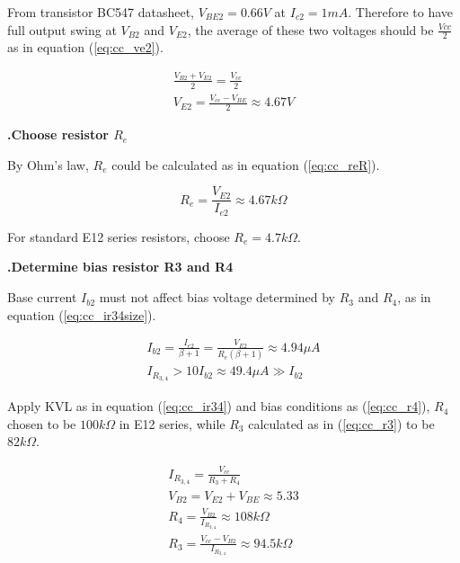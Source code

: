 \documentclass[a4paper,notitlepage,10pt]{report}
\newcommand{\tab}{\hspace{0.75cm}}
\newcommand{\fontSubHeading}{\fontsize{10pt}{11pt}\selectfont}
\newcounter{sections}
\newcounter{subsections}[sections]
\begin{document}
\begin{multicols}{2}
From transistor BC547 datasheet, $V_{BE2} = 0.66V$ at $I_{c2} = 1mA$. Therefore to have full output swing at $V_{B2}$ and $V_{E2}$, the average of these two voltages should be $\frac{Vcc}{2}$ as in equation (\ref{eq:cc_ve2}).
\parskip=0pt

\begin{gather}
	\frac{V_{B2} + V_{E2}}{2} = \frac{V_{cc}}{2} \nonumber \\
	V_{E2} = \frac{V_{cc} - V_{BE}}{2} \approx 4.67V
	\label{eq:cc_ve2}
\end{gather}
\parskip=6pt

\fontSubHeading
{}
\textbf{.\tab Choose resistor $R_e$}

By Ohm’s law, $R_e$ could be calculated as in equation (\ref{eq:cc_reR}).
\parskip=0pt

\begin{equation}
	R_e = \frac{V_{E2}}{I_{e2}} \approx 4.67k\Omega
	\label{eq:cc_reR}
\end{equation}
\parskip=6pt

For standard E12 series resistors, choose $R_e = 4.7k\Omega$.

\fontSubHeading
{}
\textbf{.\tab Determine bias resistor R3 and R4}

Base current $I_{b2}$ must not affect bias voltage determined by $R_3$ and $R_4$, as in equation (\ref{eq:cc_ir34size}).
\parskip=0pt

\begin{gather}
	I_{b2} = \frac{I_{e2}}{\beta + 1} = \frac{V_{E2}}{R_e\left(\beta + 1\right)} \approx 4.94\mu A \nonumber \\
	I_{R_{3,4}} > 10 I_{b2} \approx 49.4\mu A \gg I_{b2}
	\label{eq:cc_ir34size}
\end{gather}
\parskip=6pt

Apply KVL as in equation (\ref{eq:cc_ir34}) and bias conditions as (\ref{eq:cc_r4}), $R_4$ chosen to be $100k\Omega$ in E12 series, while $R_3$ calculated as in (\ref{eq:cc_r3}) to be $82k\Omega$.
\parskip=0pt

\begin{gather}
	\label{eq:cc_ir34}
	I_{R_{3,4}} = \frac{V_{cc}}{R_3 + R_4} \\
	V_{B2} = V_{E2} + V_{BE} \approx 5.33 \nonumber \\
	\label{eq:cc_r4}
	R_4 = \frac{V_{B2}}{I_{R_{3,4}}} \approx 108k\Omega \\
	\label{eq:cc_r3}
	R_3 = \frac{V_{cc} - V_{B2}}{I_{R_{3,4}}} \approx 94.5k\Omega
\end{gather}
\parskip=6pt


\end{multicols}
\end{document}
